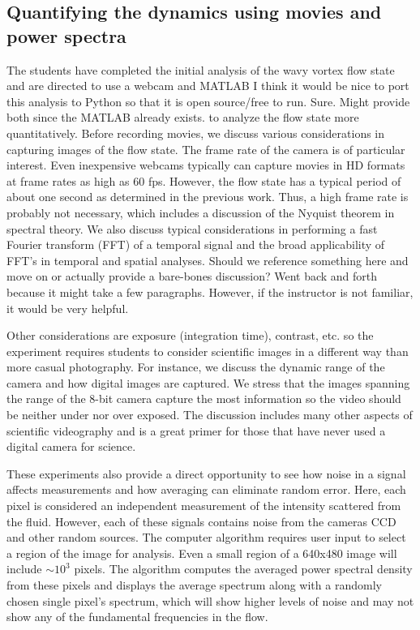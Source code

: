 \documentclass[%
reprint,
 amsmath,amssymb,
 aps,
prb,
floatfix,
longbibliography,
notitlepage
]{revtex4-1}
\newcommand{\DB}[1]{{\color{red}#1}} %
\newcommand{\BR}[1]{{\color{blue}#1}} %
\begin{document}
\subsection{Quantifying the dynamics using movies and power spectra}%
The students have completed the initial analysis of the wavy vortex flow state and are directed to use a webcam and MATLAB \DB{I think it would be nice to port this analysis to Python so that it is open source/free to run.} \BR{Sure. Might provide both since the MATLAB already exists.} to analyze the flow state more quantitatively. Before recording movies, we discuss various considerations in capturing images of the flow state. The frame rate of the camera is of particular interest. Even inexpensive webcams typically can capture movies in HD formats at frame rates as high as 60 fps. However, the flow state has a typical period of about one second as determined in the previous work. Thus, a high frame rate is probably not necessary, which includes a discussion of the Nyquist theorem in spectral theory.\cite{nyquist} We also discuss typical considerations in performing a fast Fourier transform (FFT) of a temporal signal and the broad applicability of FFT's in temporal and spatial analyses. \DB{Should we reference something here and move on or actually provide a bare-bones discussion?} \BR{Went back and forth because it might take a few paragraphs. However, if the instructor is not familiar, it would be very helpful.}

Other considerations are exposure (integration time),  contrast, etc. so the experiment requires students to consider scientific images in a different way than more casual photography. For instance, we discuss the dynamic range of the camera and how digital images are captured. We stress that the images spanning the range of the 8-bit camera capture the most information so the video should be neither under nor over exposed. The discussion includes many other aspects of scientific videography and is a great primer for those that have never used a digital camera for science.

These experiments also provide a direct opportunity to see how noise in a signal affects measurements and how averaging can eliminate random error. Here, each pixel is considered an independent measurement of the intensity scattered from the fluid. However, each of these signals contains noise from the cameras CCD and other random sources. The computer algorithm requires user input to select a region of the image for analysis. Even a small region of a 640x480 image will include $\sim 10^3$ pixels. The algorithm computes the averaged power spectral density from these pixels and displays the average spectrum along with a randomly chosen single pixel's spectrum, which will show higher levels of noise and may not show any of the fundamental frequencies in the flow. 
\end{document}
